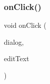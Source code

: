 \subsubsection{\texorpdfstring{on\+Click()}{onClick()}}
{\footnotesize\ttfamily void on\+Click (\begin{DoxyParamCaption}\item[{Dialog\+Interface}]{dialog,  }\item[{Edit\+Text}]{edit\+Text }\end{DoxyParamCaption})}

